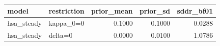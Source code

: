 \begin{tabular}{llrrr}
\toprule
model & restriction & prior\_mean & prior\_sd & sddr\_bf01 \\
\midrule
hsa\_steady & kappa\_0=0 & 0.1000 & 0.1000 & 0.0288 \\
hsa\_steady & delta=0 & 0.0000 & 0.0100 & 1.0786 \\
\bottomrule
\end{tabular}
